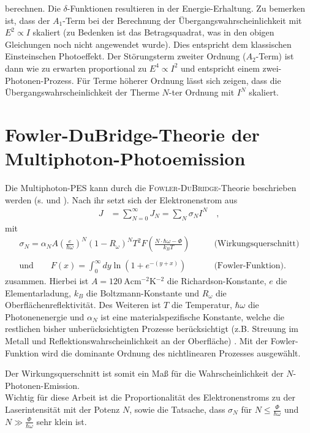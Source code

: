 \documentclass[bachelor,       %
               twoside,        %
               BCOR10mm,       %
               english,ngerman, %
               final,          %
               ]{GAUBM}
\begin{document}
berechnen.
Die $\delta$-Funktionen resultieren in der Energie-Erhaltung.
Zu bemerken ist, dass der $A_1$-Term bei der Berechnung der Übergangswahrscheinlichkeit mit $E^2\propto I$ skaliert (zu Bedenken ist das Betragsquadrat, was in den obigen Gleichungen noch nicht angewendet wurde).
Dies entspricht dem klassischen Einsteinschen Photoeffekt.
Der Störungsterm zweiter Ordnung ($A_2$-Term) ist dann wie zu erwarten proportional zu $E^4\propto I^2$ und entspricht einem zwei-Photonen-Prozess.
Für Terme höherer Ordnung lässt sich zeigen, dass die Übergangswahrscheinlichkeit der Therme $N$-ter Ordnung mit $I^N$ skaliert.

\newpage
\section{Fowler-DuBridge-Theorie der Multiphoton-Photoemission}
Die Multiphoton-PES kann durch die \textsc{Fowler-DuBridge}-Theorie beschrieben werden (s. \cite{bechtel_1977} und \cite{girardeau_1995}).
Nach ihr setzt sich der Elektronenstrom aus
\begin{align}
	J&=\sum_{N=0}^\infty J_N=\sum_N\sigma_NI^N \quad ,\label{eq:photostrom}
\end{align}
mit
\begin{align}
	\sigma_N=\alpha_NA\left(\frac{e}{\hbar\omega}\right)^N(1-R_\omega)^NT^2F\left(\frac{N\cdot \hbar\omega-\Phi}{k_BT}\right)\qquad&\text{(Wirkungsquerschnitt)}\label{eq:wirkungsquerschnitt}\\\nonumber\\
\text{und}\qquad F(x)=\int_0^\infty dy\ln \left(1+e^{-(y+x)}\right)\qquad &\text{(Fowler-Funktion).}\nonumber
\end{align}
zusammen.
Hierbei ist $A=\SI{120}{\A\cm^{-2}\K^{-2}}$ die Richardson-Konstante, $e$ die Elementarladung, $k_B$ die Boltzmann-Konstante und $R_\omega$ die Oberflächenreflektivität.
Des Weiteren ist $T$ die Temperatur, $\hbar\omega$ die Photonenenergie und $\alpha_N$ ist eine materialspezifische Konstante, welche die restlichen bisher unberücksichtigten Prozesse berücksichtigt (z.B. Streuung im Metall und Reflektionswahrscheinlichkeit an der Oberfläche) \cite{brogle}.
Mit der Fowler-Funktion wird die dominante Ordnung des nichtlinearen Prozesses ausgewählt.

Der Wirkungsquerschnitt ist somit ein Maß für die Wahrscheinlichkeit der $N$-Photonen-Emission.\\

Wichtig für diese Arbeit ist die Proportionalität des Elektronenstroms zu der Laserintensität mit der Potenz $N$, sowie die Tatsache, dass $\sigma_N$ für $N\leq\frac{\Phi}{\hbar\omega}$ und $N\gg\frac{\Phi}{\hbar\omega}$ sehr klein ist.\\\\
\end{document}
